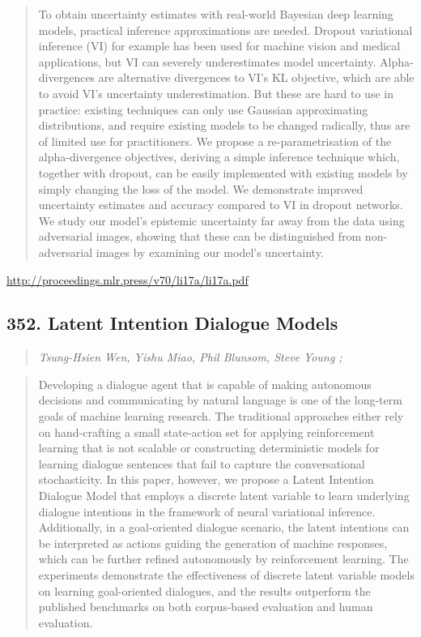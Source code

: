 \documentclass{article}
\begin{document}
\begin{quote}
    To obtain uncertainty estimates with real-world Bayesian deep learning models, practical inference approximations are needed. Dropout variational inference (VI) for example has been used for machine vision and medical applications, but VI can severely underestimates model uncertainty. Alpha-divergences are alternative divergences to VI’s KL objective, which are able to avoid VI’s uncertainty underestimation. But these are hard to use in practice: existing techniques can only use Gaussian approximating distributions, and require existing models to be changed radically, thus are of limited use for practitioners. We propose a re-parametrisation of the alpha-divergence objectives, deriving a simple inference technique which, together with dropout, can be easily implemented with existing models by simply changing the loss of the model. We demonstrate improved uncertainty estimates and accuracy compared to VI in dropout networks. We study our model’s epistemic uncertainty far away from the data using adversarial images, showing that these can be distinguished from non-adversarial images by examining our model’s uncertainty.  
\end{quote}

\href{http://proceedings.mlr.press/v70/li17a/li17a.pdf}{http://proceedings.mlr.press/v70/li17a/li17a.pdf}

\subsection{352. Latent Intention Dialogue Models}

\begin{quote}
\footnotesize{\textit{Tsung-Hsien Wen, Yishu Miao, Phil Blunsom, Steve Young ;}}

\end{quote}

\begin{quote}
    Developing a dialogue agent that is capable of making autonomous decisions and communicating by natural language is one of the long-term goals of machine learning research. The traditional approaches either rely on hand-crafting a small state-action set for applying reinforcement learning that is not scalable or constructing deterministic models for learning dialogue sentences that fail to capture the conversational stochasticity. In this paper, however, we propose a Latent Intention Dialogue Model that employs a discrete latent variable to learn underlying dialogue intentions in the framework of neural variational inference. Additionally, in a goal-oriented dialogue scenario, the latent intentions can be interpreted as actions guiding the generation of machine responses, which can be further refined autonomously by reinforcement learning. The experiments demonstrate the effectiveness of discrete latent variable models on learning goal-oriented dialogues, and the results outperform the published benchmarks on both corpus-based evaluation and human evaluation.  
\end{quote}
\end{document}
